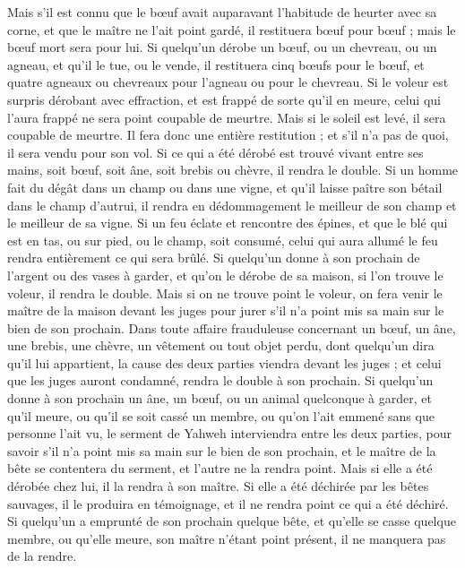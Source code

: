 \begin{multicols}{2}
Mais s'il est connu que le bœuf avait auparavant l’habitude de heurter avec sa corne, et que le maître ne l'ait point gardé, il restituera bœuf pour bœuf ; mais le bœuf mort sera pour lui.
\VerseOne{}Si quelqu'un dérobe un bœuf, ou un chevreau, ou un agneau, et qu'il le tue, ou le vende, il restituera cinq bœufs pour le bœuf, et quatre agneaux ou chevreaux pour l'agneau ou pour le chevreau.
Si le voleur est surpris dérobant avec effraction, et est frappé de sorte qu'il en meure, celui qui l'aura frappé ne sera point coupable de meurtre.
Mais si le soleil est levé, il sera coupable de meurtre. Il fera donc une entière restitution ; et s'il n'a pas de quoi, il sera vendu pour son vol.
Si ce qui a été dérobé est trouvé vivant entre ses mains, soit bœuf, soit âne, soit brebis ou chèvre, il rendra le double.
Si un homme fait du dégât dans un champ ou dans une vigne, et qu’il laisse paître son bétail dans le champ d’autrui, il rendra en dédommagement le meilleur de son champ et le meilleur de sa vigne.
Si un feu éclate et rencontre des épines, et que le blé qui est en tas, ou sur pied, ou le champ, soit consumé, celui qui aura allumé le feu rendra entièrement ce qui sera brûlé.
Si quelqu'un donne à son prochain de l'argent ou des vases à garder, et qu'on le dérobe de sa maison, si l'on trouve le voleur, il rendra le double.
Mais si on ne trouve point le voleur, on fera venir le maître de la maison devant les juges pour jurer s'il n'a point mis sa main sur le bien de son prochain.
Dans toute affaire frauduleuse concernant un bœuf, un âne, une brebis, une chèvre, un vêtement ou tout objet perdu, dont quelqu'un dira qu'il lui appartient, la cause des deux parties viendra devant les juges ; et celui que les juges auront condamné, rendra le double à son prochain.
Si quelqu'un donne à son prochain un âne, un bœuf, ou un animal quelconque à garder, et qu'il meure, ou qu'il se soit cassé un membre, ou qu'on l'ait emmené sans que personne l'ait vu,
le serment de Yahweh interviendra entre les deux parties, pour savoir s'il n'a point mis sa main sur le bien de son prochain, et le maître de la bête se contentera du serment, et l'autre ne la rendra point.
Mais si elle a été dérobée chez lui, il la rendra à son maître.
Si elle a été déchirée par les bêtes sauvages, il le produira en témoignage, et il ne rendra point ce qui a été déchiré.
Si quelqu'un a emprunté de son prochain quelque bête, et qu'elle se casse quelque membre, ou qu'elle meure, son maître n'étant point présent, il ne manquera pas de la rendre.

\end{multicols}
